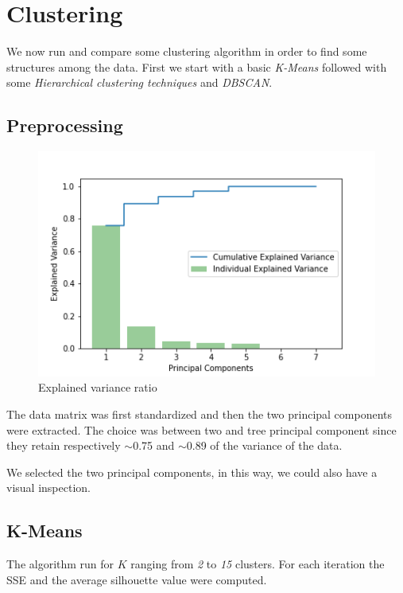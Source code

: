 \section{Clustering}
We now run and compare some clustering algorithm in order to find some structures among the data. First we start with a basic \emph{K-Means} followed with some \emph{Hierarchical clustering techniques} and \emph{DBSCAN}. 
\subsection{Preprocessing}

\begin{figure}
\vspace{-13mm}
\centering
\captionsetup{justification=centering}
\includegraphics[width=.4\textwidth]{img/clustering/pca.png}
\caption{Explained variance ratio}
\label{fig:pca_img}
\end{figure}

The data matrix was first standardized and then the two principal components were extracted. The choice was between two and tree principal component since they retain respectively $\sim$0.75 and $\sim$0.89 of the variance of the data.

We selected the two principal components, in this way, we could also have a visual inspection.

\subsection{K-Means}
The algorithm run for $K$ ranging from \emph{2} to \emph{15} clusters. For each iteration the SSE and the average silhouette value were computed.

